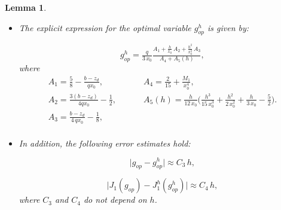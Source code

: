 \documentclass[11pt]{article}
\newtheorem{Lemma}{Lemma}
\begin{document}
    
   \begin{Lemma}\label{lema:goph} $ $
    
    \begin{itemize}
     \item[(a)] The explicit expression for the optimal variable ${g^h_{op}}$ is given by: 
     
    \begin{equation}\label{ec 3.4}
{g^h_{op}} = \tfrac{q}{3\,x_0} \tfrac{A_1 + \tfrac{h}{x_0}\,A_2 + \tfrac{h^2}{x_0^2}\, A_3}{A_4 + A_5(h)},
    \end{equation}
      where
\begin{equation}\label{Ai}
\begin{array}{ll}
A_1=\tfrac{5}{8} - \tfrac{b- z_d}{qx_0},\qquad \qquad & A_4 = \tfrac{2}{15} + \tfrac{M_1}{x_0^4},\\[0.15cm]
 A_2=\tfrac{3 (b-z_d)}{4 q x_0}  -\tfrac{1}{2}, & A_5(h) =  \tfrac{h}{12\,x_0} \Big( \tfrac{h^3}{15\, x_0^3} + \tfrac{h^2}{2 \, x_0^2} + \tfrac{h}{3\,x_0} - \tfrac{5}{2} \Big).\\[0.15cm]
  A_3=  \tfrac{b-z_d}{4\,qx_0} - \tfrac{1}{8}, \\ 
\end{array}
\end{equation}
      
     \item[(b)]In addition, the following error estimates hold:

  \begin{equation}\label{ec 3.5}
    				      \lvert g_{op} - {g^h_{op}}\rvert \approx C_3 \, h ,
    				  \end{equation}
    
\begin{equation}\label{ec 3.6}
    				     \Big \lvert J_1(g_{op}) - {J^h_{1}(g^h_{op})} \Big \rvert \approx C_4 \, h ,
    				\end{equation}
    where $C_3$  and $C_4$ do not depend on $h$.
   
    \end{itemize}
    \end{Lemma}
   
\end{document}
